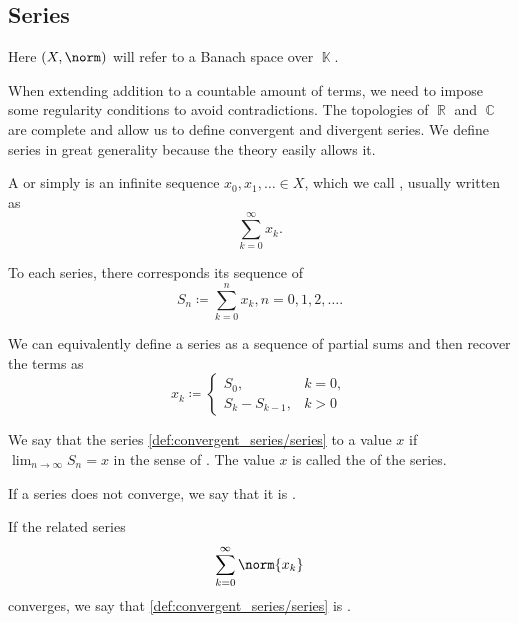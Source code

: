 \subsection{Series}\label{subsec:series}

Here \( (X, \norm) \) will refer to a Banach space over \( \BbbK \).

\begin{definition}\label{def:convergent_series}
  When extending addition to a countable amount of terms, we need to impose some regularity conditions to avoid contradictions. The topologies of \( \BbbR \) and \( \BbbC \) are complete and allow us to define convergent and divergent series. We define series in great generality because the theory easily allows it.

  A  or simply  is an infinite sequence \( x_0, x_1, \ldots \in X \), which we call , usually written as
  \begin{equation}\label{def:convergent_series/series}
    \sum_{k=0}^\infty x_k.
  \end{equation}

  To each series, there corresponds its sequence of 
  \begin{equation*}
    S_n \coloneqq \sum_{k=0}^n x_k, n = 0, 1, 2, \ldots.
  \end{equation*}

  We can equivalently define a series as a sequence of partial sums and then recover the terms as
  \begin{equation*}
    x_k \coloneqq \begin{cases}
      S_0,           & k = 0, \\
      S_k - S_{k-1}, & k > 0
    \end{cases}
  \end{equation*}

  We say that the series \eqref{def:convergent_series/series}  to a value \( x \) if \( \lim_{n \to \infty} S_n = x \) in the sense of . The value \( x \) is called the  of the series.

  If a series does not converge, we say that it is .

  If the related series
  \begin{equation}\label{def:convergent_series/absolute_series}
    \sum_{k=0}^\infty \norm{x_k}
  \end{equation}
  converges, we say that \eqref{def:convergent_series/series} is .
\end{definition}

